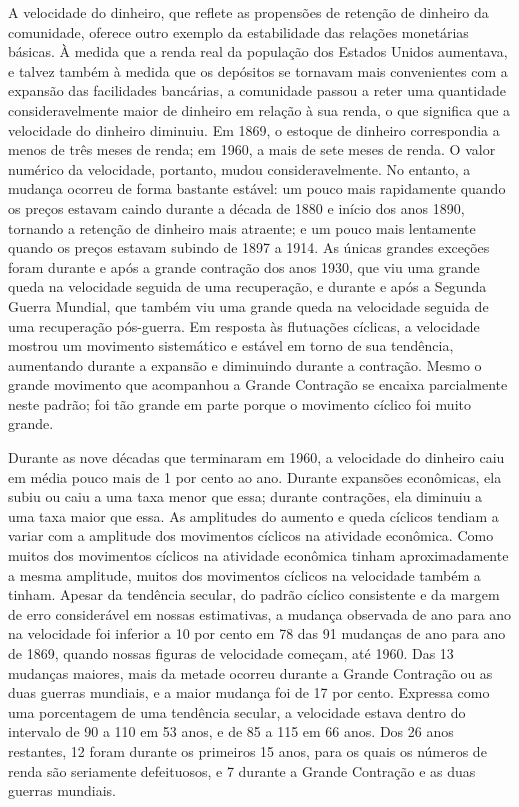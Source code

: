 \documentclass[12pt]{article}
\begin{document}
A velocidade do dinheiro, que reflete as propensões de retenção de dinheiro da comunidade, oferece outro exemplo da estabilidade das relações monetárias básicas. À medida que a renda real da população dos Estados Unidos aumentava, e talvez também à medida que os depósitos se tornavam mais convenientes com a expansão das facilidades bancárias, a comunidade passou a reter uma quantidade consideravelmente maior de dinheiro em relação à sua renda, o que significa que a velocidade do dinheiro diminuiu. Em 1869, o estoque de dinheiro correspondia a menos de três meses de renda; em 1960, a mais de sete meses de renda. O valor numérico da velocidade, portanto, mudou consideravelmente. No entanto, a mudança ocorreu de forma bastante estável: um pouco mais rapidamente quando os preços estavam caindo durante a década de 1880 e início dos anos 1890, tornando a retenção de dinheiro mais atraente; e um pouco mais lentamente quando os preços estavam subindo de 1897 a 1914. As únicas grandes exceções foram durante e após a grande contração dos anos 1930, que viu uma grande queda na velocidade seguida de uma recuperação, e durante e após a Segunda Guerra Mundial, que também viu uma grande queda na velocidade seguida de uma recuperação pós-guerra. Em resposta às flutuações cíclicas, a velocidade mostrou um movimento sistemático e estável em torno de sua tendência, aumentando durante a expansão e diminuindo durante a contração. Mesmo o grande movimento que acompanhou a Grande Contração se encaixa parcialmente neste padrão; foi tão grande em parte porque o movimento cíclico foi muito grande.

Durante as nove décadas que terminaram em 1960, a velocidade do dinheiro caiu em média pouco mais de 1 por cento ao ano. Durante expansões econômicas, ela subiu ou caiu a uma taxa menor que essa; durante contrações, ela diminuiu a uma taxa maior que essa. As amplitudes do aumento e queda cíclicos tendiam a variar com a amplitude dos movimentos cíclicos na atividade econômica. Como muitos dos movimentos cíclicos na atividade econômica tinham aproximadamente a mesma amplitude, muitos dos movimentos cíclicos na velocidade também a tinham. Apesar da tendência secular, do padrão cíclico consistente e da margem de erro considerável em nossas estimativas, a mudança observada de ano para ano na velocidade foi inferior a 10 por cento em 78 das 91 mudanças de ano para ano de 1869, quando nossas figuras de velocidade começam, até 1960. Das 13 mudanças maiores, mais da metade ocorreu durante a Grande Contração ou as duas guerras mundiais, e a maior mudança foi de 17 por cento. Expressa como uma porcentagem de uma tendência secular, a velocidade estava dentro do intervalo de 90 a 110 em 53 anos, e de 85 a 115 em 66 anos. Dos 26 anos restantes, 12 foram durante os primeiros 15 anos, para os quais os números de renda são seriamente defeituosos, e 7 durante a Grande Contração e as duas guerras mundiais.
\end{document}
